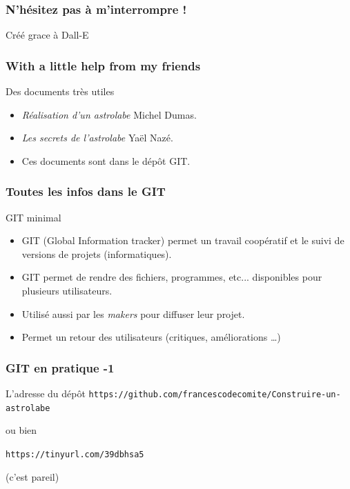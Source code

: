 \documentclass{beamer}
\begin{document}
\begin{frame}\frametitle{N'hésitez pas à  m'interrompre !}
\begin{center}
\end{center}
{\hfill \small Créé grace à Dall-E}
   \end{frame}

   \begin{frame}\frametitle{With a little help from my friends}
\begin{block}{Des documents très utiles}
\begin{itemize}
\item {\em Réalisation d'un astrolabe} Michel Dumas. 
\item {\em Les secrets de l'astrolabe} Ya{\"e}l Nazé.
\item Ces documents sont dans le dépôt GIT. 
\end{itemize}
\end{block}

   \end{frame}
      
   

\begin{frame}\frametitle{Toutes les infos dans le GIT}
\begin{block}{GIT minimal}
\begin{itemize}
\item GIT (Global Information tracker) permet un travail coopératif et le suivi de
versions de projets (informatiques). 
\item GIT permet de rendre des fichiers, programmes, etc... disponibles pour plusieurs utilisateurs.
\item Utilisé aussi par les {\it makers} pour diffuser leur projet. 
\item Permet un retour des utilisateurs (critiques, améliorations \dots)
\end{itemize}
\end{block}
   \end{frame}
   


\begin{frame}\frametitle{GIT en pratique -1}
\begin{block}{L'adresse du dépôt}
{\small \tt https://github.com/francescodecomite/Construire-un-astrolabe}

ou bien 


{\tt https://tinyurl.com/39dbhsa5}

(c'est pareil)
\end{block}
\vfill
\ 

\end{frame}
\end{document}
